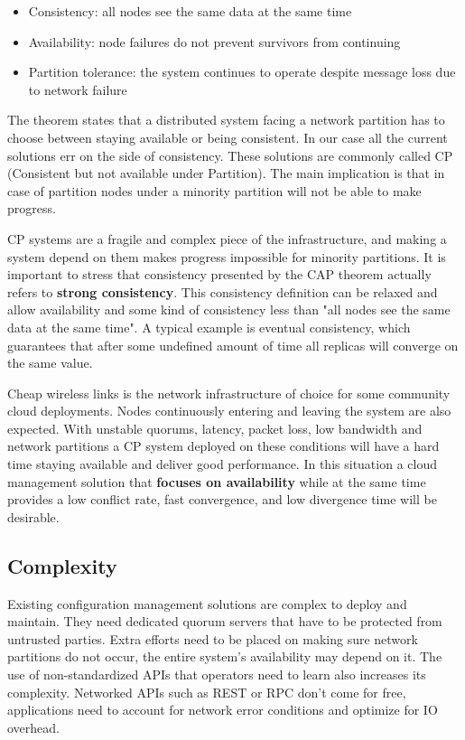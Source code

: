 \documentclass{sig-alternate}
\begin{document}
\begin{itemize}
\item Consistency: all nodes see the same data at the same time
\item Availability: node failures do not prevent survivors from continuing
\item Partition tolerance: the system continues to operate despite message loss due to network failure
\end{itemize}
    
The theorem states that a distributed system facing a network partition has to choose between staying available or being consistent. In our case all the current solutions err on the side of consistency. These solutions are commonly called CP (Consistent but not available under Partition). The main implication is that in case of partition nodes under a minority partition will not be able to make progress.

CP systems are a fragile and complex piece of the infrastructure, and making a system depend on them makes progress impossible for minority partitions. It is important to stress that consistency presented by the CAP theorem actually refers to \textbf{strong consistency}. This consistency definition can be relaxed and allow availability and some kind of consistency less than "all nodes see the same data at the same time". A typical example is eventual consistency, which guarantees that after some undefined amount of time all replicas will converge on the same value.

Cheap wireless links is the network infrastructure of choice for some community cloud deployments. Nodes continuously entering and leaving the system are also expected. With unstable quorums, latency, packet loss, low bandwidth and network partitions a CP system deployed on these conditions will have a hard time staying available and deliver good performance. In this situation a cloud management solution that \textbf{focuses on availability} while at the same time provides a low conflict rate, fast convergence, and low divergence time will be desirable.


\subsection{Complexity}

Existing configuration management solutions are complex to deploy and maintain. They need dedicated quorum servers that have to be protected from untrusted parties. Extra efforts need to be placed on making sure network partitions do not occur, the entire system's availability may depend on it. The use of non-standardized APIs that operators need to learn also increases its complexity. Networked APIs such as REST or RPC don't come for free, applications need to account for network error conditions and optimize for IO overhead.
\end{document}

